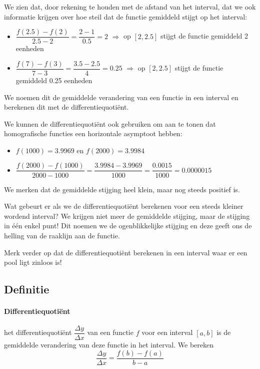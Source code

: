 \documentclass[12pt]{article}
\begin{document}
\begin{theorie}
We zien dat, door rekening te houden met de afstand van het interval, dat we ook informatie krijgen over hoe steil dat de functie gemiddeld stijgt op het interval:
\begin{itemize}
  \item $\dfrac{f(2.5)-f(2)}{2.5-2}=\dfrac{2-1}{0.5}=2$ $\Rightarrow$ op $[2, 2.5]$ stijgt de functie gemiddeld 2 eenheden
  \item $\dfrac{f(7)-f(3)}{7-3}=\dfrac{3.5-2.5}{4}=0.25$ $\Rightarrow$ op $[2, 2.5]$ stijgt de functie gemiddeld 0.25 eenheden
\end{itemize}

We noemen dit de gemiddelde verandering van een functie in een interval en berekenen dit met de differentiequotiënt.

We kunnen de differentiequotiënt ook gebruiken om aan te tonen dat homografische functies een horizontale asymptoot hebben:
\begin{itemize}
  \item $f(1000)=3.9969$ en $f(2000)=3.9984$
  \item $\dfrac{f(2000)-f(1000)}{2000-1000}=\dfrac{3.9984-3.9969}{1000}=\dfrac{0.0015}{1000}=0.0000015$
\end{itemize}
We merken dat de gemiddelde stijging heel klein, maar nog steeds positief is.

Wat gebeurt er als we de differentiequotiënt berekenen voor een steeds kleiner wordend interval? We krijgen niet meer de gemiddelde stijging, maar de stijging in één enkel punt! Dit noemen we de ogenblikkelijke stijging en deze geeft ons de helling van de raaklijn aan de functie.

Merk verder op dat de differentiequotiënt berekenen in een interval waar er een pool ligt zinloos is!

\subsection{Definitie}
\paragraph{Differentiequotiënt}
\begin{mdframed}
het differentiequotiënt $\dfrac{\Delta y}{\Delta x}$ van een functie $f$ voor een interval $[a, b]$ is de gemiddelde verandering van deze functie in het interval. We bereken
$$\dfrac{\Delta y}{\Delta x}=\dfrac{f(b)-f(a)}{b-a}$$
\end{mdframed}


\end{theorie}
\end{document}
